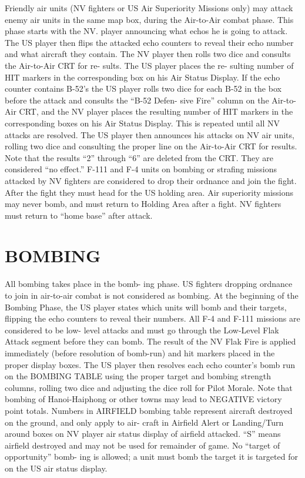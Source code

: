 Friendly air units (NV fighters or US
Air Superiority Missions only) may
attack enemy air units in the same
map box, during the Air-to-Air
combat phase. This phase starts with
the NV. player announcing what
echos he is going to attack. The US
player then flips the attacked echo
counters to reveal their echo number
and what aircraft they contain. The
NV player then rolls two dice and
consults the Air-to-Air CRT for re-
sults. The US player places the re-
sulting number of HIT markers in the
corresponding box on his Air Status
Display. If the echo counter contains
B-52’s the US player rolls two dice
for each B-52 in the box before the
attack and consults the ``B-52 Defen-
sive Fire'' column on the Air-to-Air
CRT, and the NV player places the
resulting number of HIT markers in
the corresponding boxes on his Air 
Status Display. This is repeated 
until all NV attacks are resolved.
The US player then announces his 
attacks on NV air units, rolling two 
dice and consulting the proper line 
on the Air-to-Air CRT for results.
Note that the results “2” through 
“6” are deleted from the CRT. They 
are considered “no effect.”
F-111 and F-4 units on bombing or 
strafing missions attacked by NV 
fighters are considered to drop their 
ordnance and join the fight. After 
the fight they must head for the US 
holding area.
Air superiority missions may never 
bomb, and must return to Holding 
Area after a fight.
NV fighters must return to “home 
base” after attack.

\section*{BOMBING}
All bombing takes place in the bomb-
ing phase. US fighters dropping 
ordnance to join in air-to-air combat is 
not considered as bombing.
At the beginning of the Bombing 
Phase, the US player states which 
units will bomb and their targets, 
flipping the echo counters to reveal 
their numbers. All F-4 and F-111 
missions are considered to be low-
level attacks and must go through the 
Low-Level Flak Attack segment before 
they can bomb. The result of the NV 
Flak Fire is applied immediately 
(before resolution of bomb-run) and 
hit markers placed in the proper 
display boxes.
The US player then resolves each 
echo counter’s bomb run on the 
BOMBING TABLE using the proper 
target and bombing strength columns, 
rolling two dice and adjusting the 
dice roll for Pilot Morale. Note that 
bombing of Hanoi-Haiphong or other 
towns may lead to NEGATIVE 
victory point totals.
Numbers in AIRFIELD bombing 
table represent aircraft destroyed on
the ground, and only apply to air-
craft in Airfield Alert or Landing/Turn
around boxes on NV player air status
display of airfield attacked. “S”
means airfield destroyed and may not
be used for remainder of game.
No “target of opportunity” bomb-
ing is allowed; a unit must bomb the
target it is targeted for on the US air
status display.

